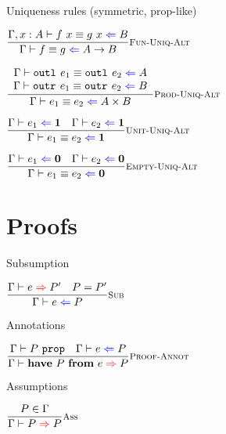 \documentclass{beamer}
\begin{document}
\begin{frame}{Uniqueness rules (symmetric, prop-like)}

\begin{center}
  $\infrule[Fun-Uniq-Alt]{\checkcompeq[\extend{\Gamma}{x}{A}]{\app{f}{x}}{\app{g}{x}}{B}}{\checkcompeq{f}{g}{\Fun{A}{B}}}$

  \vspace{2em}

  $\infrule[Prod-Uniq-Alt]{\begin{array}{c} \checkcompeq{\outl{e_1}}{\outl{e_2}}{A} \\ \checkcompeq{\outr{e_1}}{\outr{e_2}}{B} \end{array}}{\checkcompeq{e_1}{e_2}{\Prod{A}{B}}}$

  \vspace{2em}

  $\infrule[Unit-Uniq-Alt]{\check{e_1}{\Unit} \quad \check{e_2}{\Unit}}{\checkcompeq{e_1}{e_2}{\Unit}}$

  \vspace{2em}

  $\infrule[Empty-Uniq-Alt]{\check{e_1}{\Empty} \quad \check{e_2}{\Empty}}{\checkcompeq{e_1}{e_2}{\Empty}}$

\end{center}

\end{frame}

\section{Proofs}

\begin{frame}{Subsumption}

\begin{center}
  $\infrule[Sub]{\proofinfer{e}{P'} \quad \sidecond{P = P'}}{\proofcheck{e}{P}}$
\end{center}

\end{frame}

\begin{frame}{Annotations}

\begin{center}
  $\infrule[Proof-Annot]{\prop[\Gamma]{P} \quad \proofcheck{e}{P}}{\proofinfer{\proofannot{P}{e}}{P}}$
\end{center}

\end{frame}

\begin{frame}{Assumptions}

\begin{center}
  $\infrule[Ass]{\sidecond{P \in \Gamma}}{\proofinfer{P}{P}}$
\end{center}

\end{frame}
\end{document}
